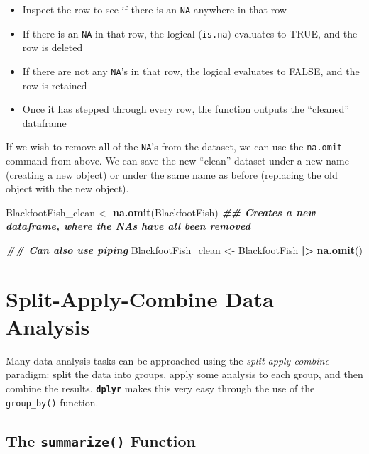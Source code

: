 \documentclass[
  10pt,
  letterpaper,
  twoside,
  openright]{book}
\newenvironment{Shaded}{\begin{snugshade}}{\end{snugshade}}
\newcommand{\DocumentationTok}[1]{\textcolor[rgb]{0.56,0.35,0.01}{\textbf{\textit{#1}}}}
\newcommand{\FunctionTok}[1]{\textcolor[rgb]{0.13,0.29,0.53}{\textbf{#1}}}
\newcommand{\NormalTok}[1]{#1}
\newcommand{\OtherTok}[1]{\textcolor[rgb]{0.56,0.35,0.01}{#1}}
\newcommand{\SpecialCharTok}[1]{\textcolor[rgb]{0.81,0.36,0.00}{\textbf{#1}}}
\providecommand{\tightlist}{%
  \setlength{\itemsep}{0pt}\setlength{\parskip}{0pt}}
\begin{document}
\begin{itemize}
\tightlist
\item
  Inspect the row to see if there is an \texttt{NA} anywhere in that
  row\\
\item
  If there is an \texttt{NA} in that row, the logical (\texttt{is.na})
  evaluates to TRUE, and the row is deleted\\
\item
  If there are not any \texttt{NA}'s in that row, the logical evaluates
  to FALSE, and the row is retained\\
\item
  Once it has stepped through every row, the function outputs the
  ``cleaned'' dataframe
\end{itemize}

If we wish to remove all of the \texttt{NA}'s from the dataset, we can
use the \texttt{na.omit} command from above. We can save the new
``clean'' dataset under a new name (creating a new object) or under the
same name as before (replacing the old object with the new object).

\begin{Shaded}
\begin{Highlighting}[]
\NormalTok{BlackfootFish\_clean }\OtherTok{\textless{}{-}} \FunctionTok{na.omit}\NormalTok{(BlackfootFish) }
\DocumentationTok{\#\# Creates a new dataframe, where the NA\textquotesingle{}s have all been removed }

\DocumentationTok{\#\# Can also use piping}
\NormalTok{BlackfootFish\_clean }\OtherTok{\textless{}{-}}\NormalTok{ BlackfootFish }\SpecialCharTok{|\textgreater{}}
  \FunctionTok{na.omit}\NormalTok{() }
\end{Highlighting}
\end{Shaded}

\hypertarget{split-apply-combine-data-analysis}{%
\section{Split-Apply-Combine Data
Analysis}\label{split-apply-combine-data-analysis}}

Many data analysis tasks can be approached using the
\emph{split-apply-combine} paradigm: split the data into groups, apply
some analysis to each group, and then combine the results.
\textbf{\texttt{dplyr}} makes this very easy through the use of the
\texttt{group\_by()} function.

\hypertarget{the-summarize-function}{%
\subsection{\texorpdfstring{The \texttt{summarize()}
Function}{The summarize() Function}}\label{the-summarize-function}}
\end{document}
